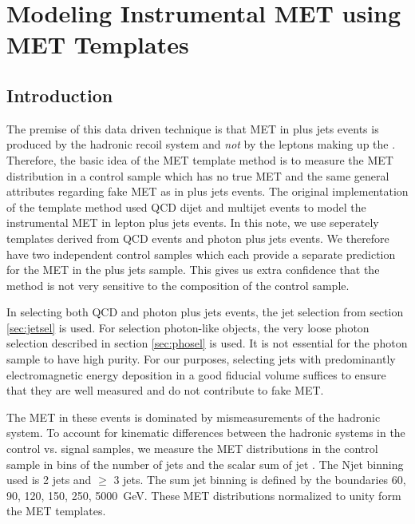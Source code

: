 
\section{Modeling Instrumental MET using MET Templates}
\label{sec:templates}

\subsection{Introduction}

The premise of this data driven technique is that MET in \Z plus jets events
is produced by the hadronic recoil system and {\it not} by the leptons making up the \Z.
Therefore, the basic idea of the MET template method is to measure the MET distribution in 
a control sample which has no true MET and the same general attributes regarding
fake MET as in \Z plus jets events.
The original implementation of the template method used QCD dijet and multijet events
to model the instrumental MET in lepton plus jets events.
In this note, we use seperately templates derived from QCD events and photon plus
jets events. We therefore have two independent control samples which each provide
a separate prediction for the MET in the \Z plus jets sample. This gives us extra
confidence that the method is not very sensitive to the composition of the control
sample.

In selecting both QCD and photon plus jets events, 
the jet selection from section \ref{sec:jetsel} is used.
For selection photon-like objects, the very loose photon selection described in section
\ref{sec:phosel} is used.
It is not essential for the photon sample to have high purity.
For our purposes, selecting jets with predominantly 
electromagnetic energy deposition in a good fiducial volume suffices to ensure that 
they are well measured and do not contribute to fake MET.

The MET in these events is dominated by mismeasurements of the hadronic system. 
To account for kinematic differences between the hadronic systems in the control vs. signal 
samples, we measure the MET distributions in the control sample in bins of the number of jets 
and the scalar sum of jet \pt. 
The Njet binning used is 2 jets and $\ge$ 3 jets. 
The sum jet \pt binning is defined by the boundaries {60, 90, 120, 150, 250, 5000}~GeV.
These MET distributions normalized to unity form the MET templates.

